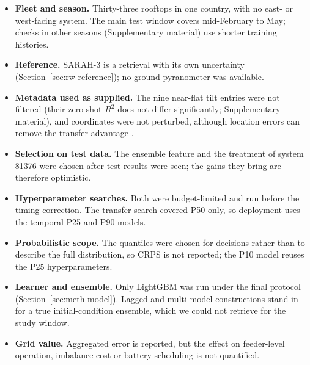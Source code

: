 \begin{itemize}
\item \textbf{Fleet and season.} Thirty-three rooftops in one country, with no east- or west-facing system. The main test window covers mid-February to May; checks in other seasons (Supplementary material) use shorter training histories.
\item \textbf{Reference.} SARAH-3 is a retrieval with its own uncertainty (Section~\ref{sec:rw-reference}); no ground pyranometer was available.
\item \textbf{Metadata used as supplied.} The nine near-flat tilt entries were not filtered (their zero-shot $R^2$ does not differ significantly; Supplementary material), and coordinates were not perturbed, although location errors can remove the transfer advantage \citep{Depoortere2025}.
\item \textbf{Selection on test data.} The ensemble feature and the treatment of system 81376 were chosen after test results were seen; the gains they bring are therefore optimistic.
\item \textbf{Hyperparameter searches.} Both were budget-limited and run before the timing correction. The transfer search covered P50 only, so deployment uses the temporal P25 and P90 models.
\item \textbf{Probabilistic scope.} The quantiles were chosen for decisions rather than to describe the full distribution, so CRPS is not reported; the P10 model reuses the P25 hyperparameters.
\item \textbf{Learner and ensemble.} Only LightGBM was run under the final protocol (Section~\ref{sec:meth-model}). Lagged and multi-model constructions stand in for a true initial-condition ensemble, which we could not retrieve for the study window.
\ifepsr
\item \textbf{Grid value.} Aggregated error is reported, but the effect on feeder-level operation, imbalance cost or battery scheduling is not quantified.
\fi
\end{itemize}
